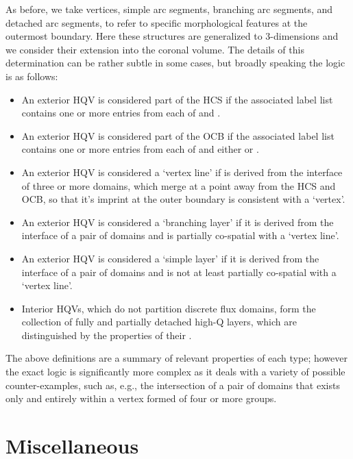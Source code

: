 \documentclass[10pt]{aastex62}
\begin{document}
\begin{itemize}
As before, we take vertices, simple arc segments, branching arc segments, and detached arc segments, to refer to specific morphological features at the outermost boundary.
Here these structures are generalized to 3-dimensions and we consider their extension into the coronal volume. 
The details of this determination can be rather subtle in some cases, but broadly speaking the logic is as follows:
\begin{itemize}
\item An exterior HQV is considered part of the HCS if the associated label list contains one or more entries from each of  and .
\item An exterior HQV is considered part of the OCB if the associated label list contains one or more entries from each of  and either  or .
\item An exterior HQV is considered a `vertex line' if is derived from the interface of three or more domains, which merge at a point away from the HCS and OCB, so that it's imprint at the outer boundary is consistent with a `vertex'.
\item An exterior HQV is considered a `branching layer' if it is derived from the interface of a pair of domains and is partially co-spatial with a `vertex line'.
\item An exterior HQV is considered a `simple layer' if it is derived from the interface of a pair of domains and is not at least partially co-spatial with a `vertex line'.
\item Interior HQVs, which do not partition discrete flux domains, form the collection of fully and partially detached high-Q layers, which are distinguished by the properties of their . 
\end{itemize}
The above definitions are a summary of relevant properties of each type; however the exact logic is significantly more complex as it deals with a variety of possible counter-examples, such as, e.g., the intersection of a pair of domains that exists only and entirely within a vertex formed of four or more groups.
 
\section{Miscellaneous}


\end{itemize}
\end{document}
